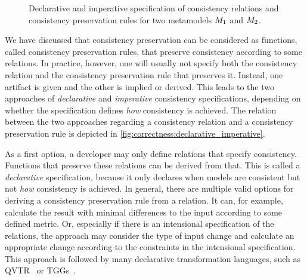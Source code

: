 \begin{figure}
    \centering
    
    \caption[Declarative and imperative consistency specification]{Declarative and imperative specification of consistency relations and consistency preservation rules for two metamodels $\metamodel{M}{1}$ and $\metamodel{M}{2}$.}
    \label{fig:correctness:declarative_imperative}
\end{figure}

We have discussed that consistency preservation can be considered as functions, called consistency preservation rules, that preserve consistency according to some relations.
In practice, however, one will usually not specify both the consistency relation and the consistency preservation rule that preserves it.
Instead, one artifact is given and the other is implied or derived.
This leads to the two approaches of \emph{declarative} and \emph{imperative} consistency specifications, depending on whether the specification defines \emph{how} consistency is achieved.
The relation between the two approaches regarding a consistency relation and a consistency preservation rule is depicted in \autoref{fig:correctness:declarative_imperative}.

As a first option, a developer may only define relations that specify consistency. Functions that preserve these relations can be derived from that.
This is called a \emph{declarative} specification, because it only declares when models are consistent but not \emph{how} consistency is achieved.
In general, there are multiple valid options for deriving a consistency preservation rule from a relation.
It can, for example, calculate the result with minimal differences to the input according to some defined metric.
Or, especially if there is an intensional specification of the relations, the approach may consider the type of input change and calculate an appropriate change according to the constraints in the intensional specification.
This approach is followed by many declarative transformation languages, such as \gls{QVTR}~\cite{qvt} or \glspl{TGG}~\cite{anjorin2014EfficientSynchronizationTGG-ECMFA}.

